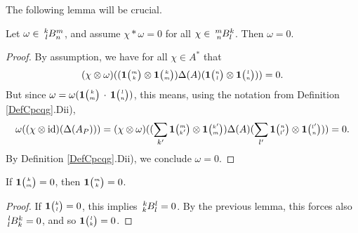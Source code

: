 The following lemma will be crucial.

\begin{Lem}\label{LemRefSep} Let $\omega \in \Gr{B}{k}{m}{l}{n}$, and assume $\chi*\omega =  0$ for all $\chi \in \Gr{B}{m}{k}{n}{l}$. Then $\omega =0$.
\end{Lem} 
\begin{proof} By assumption, we have for all $\chi\in A^*$ that \[(\chi\otimes \omega)((\UnitC{m}{k}\otimes \UnitC{k}{m})\Delta(A)(\UnitC{n}{l}\otimes \UnitC{l}{n}))=0.\] But since $\omega = \omega(\UnitC{k}{m}\,\cdot\,\UnitC{l}{n})$, this means, using the notation from Definition \ref{DefCpcqg}.Dii), \[\omega((\chi\otimes \id)(\Delta(A_P))) =(\chi\otimes \omega)((\sum_{k'}\UnitC{m}{k'}\otimes \UnitC{k'}{m})\Delta(A)(\sum_{l'}\UnitC{n}{l'}\otimes \UnitC{l'}{n})) =0.\] By Definition \ref{DefCpcqg}.Dii), we conclude $\omega=0$.
\end{proof} 

\begin{Cor} If $\UnitC{k}{m}=0$, then $\UnitC{m}{k}=0$. 
\end{Cor}
\begin{proof} If $\UnitC{k}{l}=0$, this implies $\Gr{B}{k}{l}{k}{l}=0$. By the previous lemma, this forces also $\Gr{B}{l}{k}{l}{k}=0$, and so $\UnitC{l}{k}=0$. 
\end{proof} 

